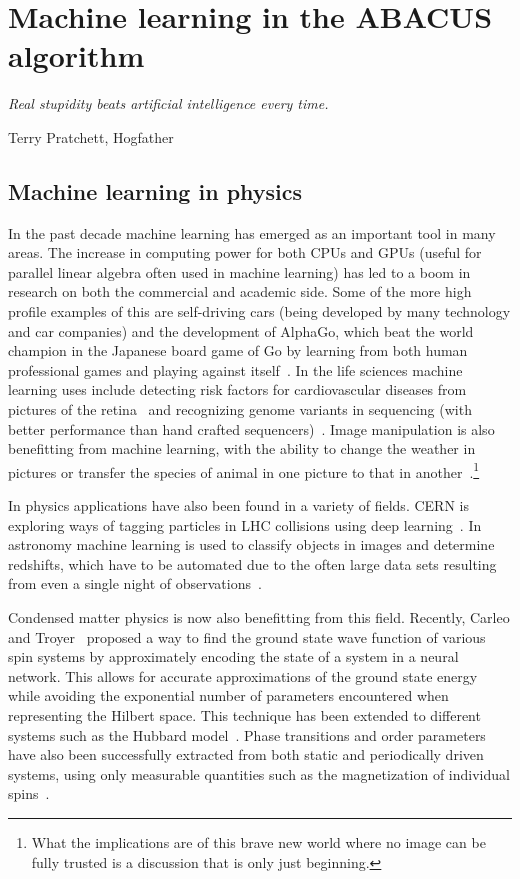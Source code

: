 \documentclass[11pt, a4paper]{report} %
\begin{document}
\chapter{Machine learning in the ABACUS algorithm}\label{chap:machine_learning}

\epigraph{\textit{Real stupidity beats artificial intelligence every time.}}{Terry Pratchett, Hogfather}

\section{Machine learning in physics}

In the past decade machine learning has emerged as an important tool in many areas.
The increase in computing power for both CPUs and GPUs (useful for parallel linear algebra often used in machine learning) has led to a boom in research on both the commercial and academic side.
Some of the more high profile examples of this are self-driving cars (being developed by many technology and car companies) and the development of AlphaGo, which beat the world champion in the Japanese board game of Go by learning from both human professional games and playing against itself~\cite{Silver2017a,Silver2017}.
In the life sciences machine learning uses include detecting risk factors for cardiovascular diseases from pictures of the retina~\cite{poplin17_predic_cardiov_risk_factor_from} and recognizing genome variants in sequencing (with better performance than hand crafted sequencers)~\cite{Poplin2016}.
Image manipulation is also benefitting from machine learning, with the ability to change the weather in pictures or transfer the species of animal in one picture to that in another~\cite{Liu2017}.\footnote{What the implications are of this brave new world where no image can be fully trusted is a discussion that is only just beginning.}

In physics applications have also been found in a variety of fields.
CERN is exploring ways of tagging particles in LHC collisions using deep learning~\cite{paganini17_machin_learn_algor_jet_taggin}.
In astronomy machine learning is used to classify objects in images and determine redshifts, which have to be automated due to the often large data sets resulting from even a single night of observations~\cite{ball10_data_minin_and_machin_learn_in_astron}.

Condensed matter physics is now also benefitting from this field.
Recently, Carleo and Troyer~\cite{Carleo2017} proposed a way to find the ground state wave function of various spin systems by approximately encoding the state of a system in a neural network. This allows for accurate approximations of the ground state energy while avoiding the exponential number of parameters encountered when representing the Hilbert space.
This technique has been extended to different systems such as the Hubbard model~\cite{Saito2017}.
Phase transitions and order parameters have also been successfully extracted from both static and periodically driven systems, using only measurable quantities such as the magnetization of individual spins~\cite{Nieuwenburg2017}.
\end{document}
